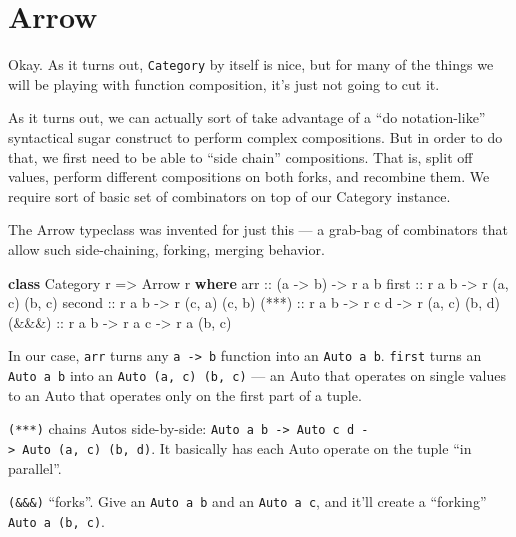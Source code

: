 \documentclass[]{article}
\newenvironment{Shaded}{}{}
\newcommand{\KeywordTok}[1]{\textcolor[rgb]{0.00,0.44,0.13}{\textbf{{#1}}}}
\newcommand{\DataTypeTok}[1]{\textcolor[rgb]{0.56,0.13,0.00}{{#1}}}
\newcommand{\OtherTok}[1]{\textcolor[rgb]{0.00,0.44,0.13}{{#1}}}
\newcommand{\NormalTok}[1]{{#1}}
\begin{document}
\section{Arrow}\label{arrow}

Okay. As it turns out, \texttt{Category} by itself is nice, but for many
of the things we will be playing with function composition, it's just
not going to cut it.

As it turns out, we can actually sort of take advantage of a ``do
notation-like'' syntactical sugar construct to perform complex
compositions. But in order to do that, we first need to be able to
``side chain'' compositions. That is, split off values, perform
different compositions on both forks, and recombine them. We require
sort of basic set of combinators on top of our Category instance.

The Arrow typeclass was invented for just this --- a grab-bag of
combinators that allow such side-chaining, forking, merging behavior.

\begin{Shaded}
\begin{Highlighting}[]
\KeywordTok{class} \DataTypeTok{Category} \NormalTok{r }\OtherTok{=>} \DataTypeTok{Arrow} \NormalTok{r }\KeywordTok{where}
\OtherTok{    arr    ::} \NormalTok{(a }\OtherTok{->} \NormalTok{b) }\OtherTok{->} \NormalTok{r a b}
\OtherTok{    first  ::} \NormalTok{r a b }\OtherTok{->} \NormalTok{r (a, c) (b, c)}
\OtherTok{    second ::} \NormalTok{r a b }\OtherTok{->} \NormalTok{r (c, a) (c, b)}
\OtherTok{    (***)  ::} \NormalTok{r a b }\OtherTok{->} \NormalTok{r c d }\OtherTok{->} \NormalTok{r (a, c) (b, d)}
\OtherTok{    (&&&)  ::} \NormalTok{r a b }\OtherTok{->} \NormalTok{r a c }\OtherTok{->} \NormalTok{r a (b, c)}
\end{Highlighting}
\end{Shaded}

In our case, \texttt{arr} turns any \texttt{a\ -\textgreater{}\ b}
function into an \texttt{Auto\ a\ b}. \texttt{first} turns an
\texttt{Auto\ a\ b} into an \texttt{Auto\ (a,\ c)\ (b,\ c)} --- an Auto
that operates on single values to an Auto that operates only on the
first part of a tuple.

\texttt{(***)} chains Autos side-by-side:
\texttt{Auto\ a\ b\ -\textgreater{}\ Auto\ c\ d\ -\textgreater{}\ Auto\ (a,\ c)\ (b,\ d)}.
It basically has each Auto operate on the tuple ``in parallel''.

\texttt{(\&\&\&)} ``forks''. Give an \texttt{Auto\ a\ b} and an
\texttt{Auto\ a\ c}, and it'll create a ``forking''
\texttt{Auto\ a\ (b,\ c)}.
\end{document}
